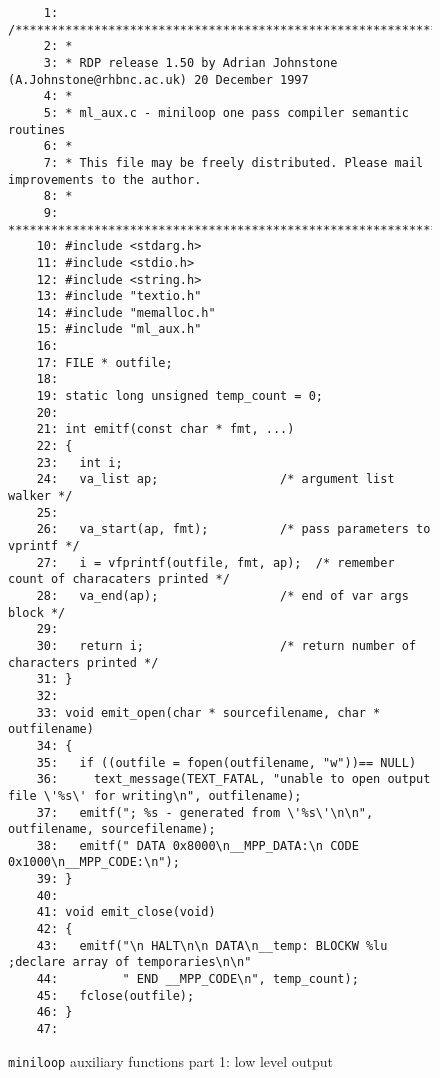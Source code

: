 \begin{figure}
\hspace*{-2cm}
\begin{minipage}{30cm}
\footnotesize
\begin{verbatim}
     1: /*******************************************************************************
     2: *
     3: * RDP release 1.50 by Adrian Johnstone (A.Johnstone@rhbnc.ac.uk) 20 December 1997
     4: *
     5: * ml_aux.c - miniloop one pass compiler semantic routines
     6: *
     7: * This file may be freely distributed. Please mail improvements to the author.
     8: *
     9: *******************************************************************************/
    10: #include <stdarg.h>
    11: #include <stdio.h>
    12: #include <string.h>
    13: #include "textio.h"
    14: #include "memalloc.h"
    15: #include "ml_aux.h"
    16: 
    17: FILE * outfile; 
    18: 
    19: static long unsigned temp_count = 0; 
    20: 
    21: int emitf(const char * fmt, ...)
    22: {
    23:   int i; 
    24:   va_list ap;                 /* argument list walker */
    25:   
    26:   va_start(ap, fmt);          /* pass parameters to vprintf */
    27:   i = vfprintf(outfile, fmt, ap);  /* remember count of characaters printed */
    28:   va_end(ap);                 /* end of var args block */
    29:   
    30:   return i;                   /* return number of characters printed */
    31: }
    32: 
    33: void emit_open(char * sourcefilename, char * outfilename)
    34: {
    35:   if ((outfile = fopen(outfilename, "w"))== NULL)
    36:     text_message(TEXT_FATAL, "unable to open output file \'%s\' for writing\n", outfilename); 
    37:   emitf("; %s - generated from \'%s\'\n\n", outfilename, sourcefilename); 
    38:   emitf(" DATA 0x8000\n__MPP_DATA:\n CODE 0x1000\n__MPP_CODE:\n"); 
    39: }
    40: 
    41: void emit_close(void)
    42: {
    43:   emitf("\n HALT\n\n DATA\n__temp: BLOCKW %lu  ;declare array of temporaries\n\n"
    44:         " END __MPP_CODE\n", temp_count); 
    45:   fclose(outfile); 
    46: }
    47: 
\end{verbatim}
\end{minipage}
\caption{{\tt miniloop} auxiliary functions part 1: low level output}
\label{ml_aux.c:1}
\end{figure}

